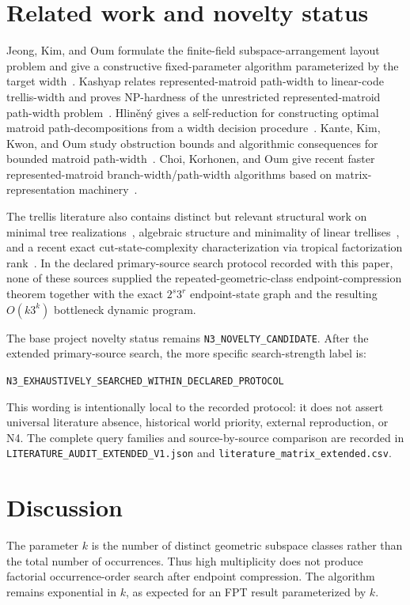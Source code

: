\documentclass[11pt]{article}
\begin{document}
\section{Related work and novelty status}
Jeong, Kim, and Oum formulate the finite-field subspace-arrangement layout problem and give a constructive fixed-parameter algorithm parameterized by the target width~\cite{JKO}. Kashyap relates represented-matroid path-width to linear-code trellis-width and proves NP-hardness of the unrestricted represented-matroid path-width problem~\cite{KashyapPW}. Hlin\v{e}n\'y gives a self-reduction for constructing optimal matroid path-decompositions from a width decision procedure~\cite{Hlineny}. Kante, Kim, Kwon, and Oum study obstruction bounds and algorithmic consequences for bounded matroid path-width~\cite{Kante}. Choi, Korhonen, and Oum give recent faster represented-matroid branch-width/path-width algorithms based on matrix-representation machinery~\cite{Choi}.

The trellis literature also contains distinct but relevant structural work on minimal tree realizations~\cite{KashyapTree}, algebraic structure and minimality of linear trellises~\cite{ContiBoston}, and a recent exact cut-state-complexity characterization via tropical factorization rank~\cite{Sheshadri}. In the declared primary-source search protocol recorded with this paper, none of these sources supplied the repeated-geometric-class endpoint-compression theorem together with the exact $2^s3^r$ endpoint-state graph and the resulting $O(k3^k)$ bottleneck dynamic program.

The base project novelty status remains \texttt{N3\_NOVELTY\_CANDIDATE}. After the extended primary-source search, the more specific search-strength label is:
\begin{center}
\texttt{N3\_EXHAUSTIVELY\_SEARCHED\_WITHIN\_DECLARED\_PROTOCOL}
\end{center}
This wording is intentionally local to the recorded protocol: it does not assert universal literature absence, historical world priority, external reproduction, or N4. The complete query families and source-by-source comparison are recorded in \texttt{LITERATURE\_AUDIT\_EXTENDED\_V1.json} and \texttt{literature\_matrix\_extended.csv}.

\section{Discussion}
The parameter $k$ is the number of distinct geometric subspace classes rather than the total number of occurrences. Thus high multiplicity does not produce factorial occurrence-order search after endpoint compression. The algorithm remains exponential in $k$, as expected for an FPT result parameterized by $k$.
\end{document}
